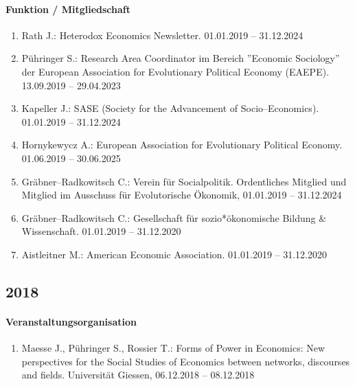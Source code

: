 \paragraph{Funktion / Mitgliedschaft}
\begin{enumerate}[leftmargin=*, labelsep=0.5cm]
\item Rath J.: Heterodox Economics Newsletter. 01.01.2019 -- 31.12.2024
\item Pühringer S.: Research Area Coordinator im Bereich ''Economic Sociology'' der European Association for Evolutionary Political Economy (EAEPE). 13.09.2019 -- 29.04.2023
\item Kapeller J.: SASE (Society for the Advancement of Socio--Economics). 01.01.2019 -- 31.12.2024
\item Hornykewycz A.: European Association for Evolutionary Political Economy. 01.06.2019 -- 30.06.2025
\item Gräbner--Radkowitsch C.: Verein für Socialpolitik. Ordentliches Mitglied und Mitglied im Ausschuss für Evolutorische Ökonomik, 01.01.2019 -- 31.12.2024
\item Gräbner--Radkowitsch C.: Gesellschaft für sozio*ökonomische Bildung \& Wissenschaft. 01.01.2019 -- 31.12.2020
\item Aistleitner M.: American Economic Association. 01.01.2019 -- 31.12.2020
\end{enumerate}
\subsection*{2018}
\paragraph{Veranstaltungsorganisation}
\begin{enumerate}[leftmargin=*, labelsep=0.5cm]
\item Maesse J., Pühringer S., Rossier T.: Forms of Power in Economics: New perspectives for the Social Studies of Economics between networks, discourses and fields. Universität Giessen, 06.12.2018 -- 08.12.2018
\end{enumerate}


